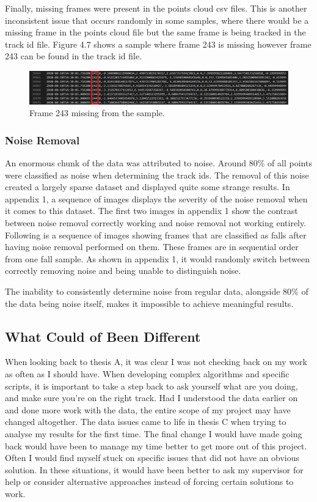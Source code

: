 Finally, missing frames were present in the points cloud csv files. This is another inconsistent issue that occurs randomly in some samples, where there would be a missing frame in the points cloud file but the same frame is being tracked in the track id file. Figure 4.7 shows a sample where frame 243 is missing however frame 243 can be found in the track id file.
\begin{figure}[H]
    \centering
    \includegraphics[width=450px, keepaspectratio=true]{missing_frames.png}
    \caption{Frame 243 missing from the sample.}
    \label{fig:my_label}
\end{figure}

\subsubsection{Noise Removal}
An enormous chunk of the data was attributed to noise. Around 80\% of all points were classified as noise when determining the track ids. The removal of this noise created a largely sparse dataset and displayed quite some strange results. In appendix 1, a sequence of images displays the severity of the noise removal when it comes to this dataset. The first two images in appendix 1 show the contrast between noise removal correctly working and noise removal not working entirely. Following is a sequence of images showing frames that are classified as falls after having noise removal performed on them. These frames are in sequential order from one fall sample. As shown in appendix 1, it would randomly switch between correctly removing noise and being unable to distinguish noise. 

The inability to consistently determine noise from regular data, alongside 80\% of the data being noise itself, makes it impossible to achieve meaningful results.

\subsection{What Could of Been Different}
When looking back to thesis A, it was clear I was not checking back on my work as often as I should have. When developing complex algorithms and specific scripts, it is important to take a step back to ask yourself what are you doing, and make sure you're on the right track. Had I understood the data earlier on and done more work with the data, the entire scope of my project may have changed altogether. The data issues came to life in thesis C when trying to analyse my results for the first time. The final change I would have made going back would have been to manage my time better to get more out of this project. Often I would find myself stuck on specific issues that did not have an obvious solution. In these situations, it would have been better to ask my supervisor for help or consider alternative approaches instead of forcing certain solutions to work. 